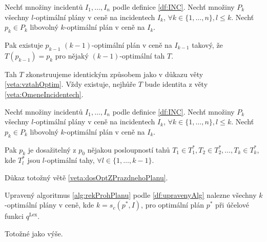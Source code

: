 \begin{veta}
  Nechť množiny incidentů $I_1, \dots, I_n$ podle definice \ref{df:INC}.
  Nechť množiny $P_{k}$ všechny $l$-optimální plány v ceně na incidentech $I_k$, $\forall k \in \{ 1, \dots, n \}, l \leq k$.
  Nechť $p_k \in P_k$ libovolný $k$-optimální plán v ceně na $I_k$.

  Pak existuje $p_{k-1}$ $(k-1)$-optimální plán v ceně na $I_{k-1}$ takový, že $T(p_{k-1}) = p_k$ pro nějaký $(k-1)$-optimální tah $T$. 
\end{veta}
\begin{dukaz}
  Tah $T$ zkonstruujeme identickým způsobem jako v důkazu věty \ref{veta:vztahOptim}. Vždy existuje, nejhůře $T$ bude identita z věty \ref{veta:OmeneIncidentech}.
\end{dukaz}

\begin{veta}\label{veta:dosOptZPrazdnehoPlanu}
  Nechť množiny incidentů $I_1, \dots, I_n$ podle definice \ref{df:INC}.
  Nechť množiny $P_{k}$ všechny $l$-optimální plány v ceně na incidentech $I_k$, $\forall k \in \{ 1, \dots, n \}, l \leq k$.
  Nechť $p_k \in P_k$ libovolný $k$-optimální plán v ceně na $I_k$.

  Pak $p_k$ je dosažitelný z $p_0$ nějakou posloupností tahů $T_1 \in T^*_1, T_2 \in T^*_2, \dots, T_k \in T^*_k$, kde $T^*_l$ jsou $l$-optimální tahy, $\forall l \in \{ 1, \dots, k-1 \}$.
\end{veta}
\begin{dukaz}
  Důkaz totožný větě \ref{veta:dosOptZPrazdnehoPlanu}.
\end{dukaz}

\begin{veta}
  Upravený algoritmus \ref{alg:rekProhPlanu} podle \ref{df:upravenyAlg} nalezne všechny $k$-optimální plány v ceně, kde $k = s_c(p^*, I)$,
  pro optimální plán $p^*$ při účelové funkci $q^{\text{Lex}}$.
\end{veta}
\begin{dukaz}
  Totožné jako výše.
\end{dukaz}

